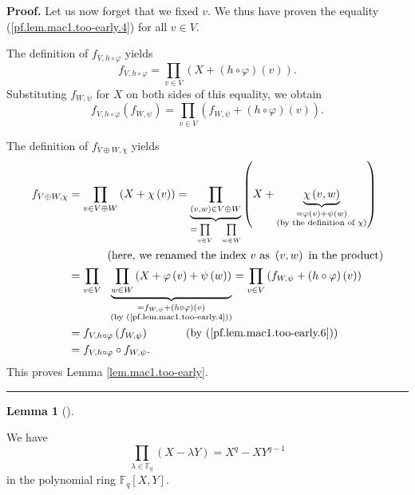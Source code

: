 \documentclass[numbers=enddot,12pt,final,onecolumn,notitlepage]{scrartcl}%
\theoremstyle{definition}
\newtheorem{lem}[theo]{Lemma}
\newenvironment{lemma}[1][]
{\begin{lem}[#1]\begin{leftbar}}
{\end{leftbar}\end{lem}}
\newenvironment{proof}[1][Proof]{\noindent\textbf{#1.} }{\ \rule{0.5em}{0.5em}}
\let\prodnonlimits\prod
\renewcommand{\prod}{\prodnonlimits\limits}
\begin{document}
\begin{proof}
Let us now forget that we fixed $v$. We thus have proven the equality
(\ref{pf.lem.mac1.too-early.4}) for all $v\in V$.

The definition of $f_{V,h\circ\varphi}$ yields%
\[
f_{V,h\circ\varphi}=\prod_{v\in V}\left(  X+\left(  h\circ\varphi\right)
\left(  v\right)  \right)  .
\]
Substituting $f_{W,\psi}$ for $X$ on both sides of this equality, we obtain%
\begin{equation}
f_{V,h\circ\varphi}\left(  f_{W,\psi}\right)  =\prod_{v\in V}\left(
f_{W,\psi}+\left(  h\circ\varphi\right)  \left(  v\right)  \right)  .
\label{pf.lem.mac1.too-early.6}%
\end{equation}


The definition of $f_{V\oplus W,\chi}$ yields%
\begin{align*}
f_{V\oplus W,\chi}  &  =\prod_{v\in V\oplus W}\left(  X+\chi\left(  v\right)
\right)  =\underbrace{\prod_{\left(  v,w\right)  \in V\oplus W}}_{=\prod_{v\in
V}\ \ \prod_{w\in W}}\left(  X+\underbrace{\chi\left(  v,w\right)
}_{\substack{=\varphi\left(  v\right)  +\psi\left(  w\right)  \\\text{(by the
definition of }\chi\text{)}}}\right) \\
&  \ \ \ \ \ \ \ \ \ \ \left(  \text{here, we renamed the index }v\text{ as
}\left(  v,w\right)  \text{ in the product}\right) \\
&  =\prod_{v\in V}\ \ \underbrace{\prod_{w\in W}\left(  X+\varphi\left(
v\right)  +\psi\left(  w\right)  \right)  }_{\substack{=f_{W,\psi}+\left(
h\circ\varphi\right)  \left(  v\right)  \\\text{(by
(\ref{pf.lem.mac1.too-early.4}))}}}=\prod_{v\in V}\left(  f_{W,\psi}+\left(
h\circ\varphi\right)  \left(  v\right)  \right) \\
&  =f_{V,h\circ\varphi}\left(  f_{W,\psi}\right)  \ \ \ \ \ \ \ \ \ \ \left(
\text{by (\ref{pf.lem.mac1.too-early.6})}\right) \\
&  =f_{V,h\circ\varphi}\circ f_{W,\psi}.
\end{align*}
This proves Lemma \ref{lem.mac1.too-early}.
\end{proof}

\begin{lemma}
\label{lem.mac1.Xq-X}We have
\begin{equation}
\prod_{\lambda\in\mathbb{F}_{q}}\left(  X-\lambda Y\right)  =X^{q}-XY^{q-1}
\label{eq.lem.mac1.Xq-X.eq}%
\end{equation}
in the polynomial ring $\mathbb{F}_{q}\left[  X,Y\right]  $.
\end{lemma}
\end{document}
